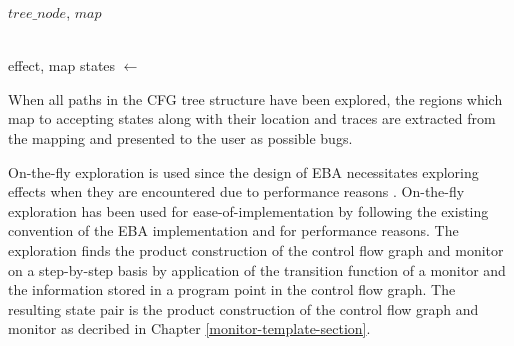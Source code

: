 \begin{algorithm}[H]
\begin{algorithmic}
     {$tree\_node$, $map$} 
            \EndIf
            
        \EndIf      
    \EndFunction
    \\
     {effect, map}
        \State states $\gets$ 
    \EndFunction
    \\
\end{algorithmic}
\end{algorithm}

\newpar When all paths in the CFG tree structure have been explored, the regions which map to accepting states along with their location and traces are extracted from the mapping and presented to the user as possible bugs.  

\newpar On-the-fly exploration is used since the design of EBA necessitates exploring effects when they are encountered due to performance reasons \cite{Abal2017EffectiveBF}. On-the-fly exploration has been used for ease-of-implementation by following the existing convention of the EBA implementation and for performance reasons. The exploration finds the product construction of the control flow graph and monitor on a step-by-step basis by application of the transition function of a monitor and the information stored in a program point in the control flow graph. The resulting state pair is the product construction of the control flow graph and monitor as decribed in Chapter \ref{monitor-template-section}. 

